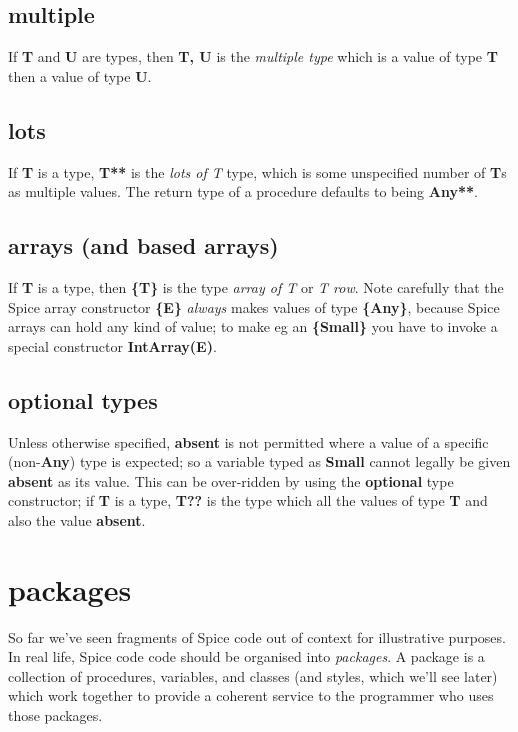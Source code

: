 \documentclass{report}
\begin{document}
\section{multiple}


If {\bf T} and {\bf U} are types, then {\bf T, U} is the {\em multiple type} which is a value
of type {\bf T} then a value of type {\bf U}.

\section{lots}


If {\bf T} is a type, {\bf T**} is the {\em lots of T} type, which is some unspecified
number of {\bf T}s as multiple values. The return type of a procedure defaults to
being {\bf Any**}.

\section{arrays (and based arrays)}


If {\bf T} is a type, then {\bf \{T\}} is the type {\em array of T} or {\em T row}. Note
carefully that the Spice array constructor {\bf \{E\}} {\em always} makes values of
type {\bf \{Any\}}, because Spice arrays can hold any kind of value; to make eg
an {\bf \{Small\}} you have to invoke a special constructor {\bf IntArray(E)}.

\section{optional types}


Unless otherwise specified, {\bf absent} is not permitted where a value of a
specific (non-{\bf Any}) type is expected; so a variable typed as {\bf Small} cannot
legally be given {\bf absent} as its value. This can be over-ridden by using the
{\bf optional} type constructor; if {\bf T} is a type, {\bf T??} is the type which all the
values of type {\bf T} and also the value {\bf absent}.\chapter{packages}


So far we've seen fragments of Spice code out of context for illustrative
purposes. In real life, Spice code code should be organised into {\em packages}.
A package is a collection of procedures, variables, and classes (and styles,
which we'll see later) which work together to provide a coherent service to
the programmer who uses those packages.
\end{document}
